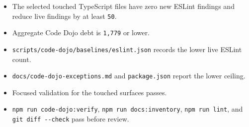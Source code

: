 \begin{itemize}
\tightlist
\item
  The selected touched TypeScript files have zero new ESLint findings and reduce live findings by at least \texttt{5\allowbreak{}0}.
\item
  Aggregate Code Dojo debt is \texttt{1\allowbreak{},\allowbreak{}7\allowbreak{}7\allowbreak{}9} or lower.
\item
  \texttt{s\allowbreak{}c\allowbreak{}r\allowbreak{}i\allowbreak{}p\allowbreak{}t\allowbreak{}s\allowbreak{}/\allowbreak{}c\allowbreak{}o\allowbreak{}d\allowbreak{}e\allowbreak{}-\allowbreak{}d\allowbreak{}o\allowbreak{}j\allowbreak{}o\allowbreak{}/\allowbreak{}b\allowbreak{}a\allowbreak{}s\allowbreak{}e\allowbreak{}l\allowbreak{}i\allowbreak{}n\allowbreak{}e\allowbreak{}s\allowbreak{}/\allowbreak{}e\allowbreak{}s\allowbreak{}l\allowbreak{}i\allowbreak{}n\allowbreak{}t\allowbreak{}.\allowbreak{}j\allowbreak{}s\allowbreak{}o\allowbreak{}n} records the lower live ESLint count.
\item
  \texttt{d\allowbreak{}o\allowbreak{}c\allowbreak{}s\allowbreak{}/\allowbreak{}c\allowbreak{}o\allowbreak{}d\allowbreak{}e\allowbreak{}-\allowbreak{}d\allowbreak{}o\allowbreak{}j\allowbreak{}o\allowbreak{}-\allowbreak{}e\allowbreak{}x\allowbreak{}c\allowbreak{}e\allowbreak{}p\allowbreak{}t\allowbreak{}i\allowbreak{}o\allowbreak{}n\allowbreak{}s\allowbreak{}.\allowbreak{}m\allowbreak{}d} and \texttt{p\allowbreak{}a\allowbreak{}c\allowbreak{}k\allowbreak{}a\allowbreak{}g\allowbreak{}e\allowbreak{}.\allowbreak{}j\allowbreak{}s\allowbreak{}o\allowbreak{}n} report the lower ceiling.
\item
  Focused validation for the touched surfaces passes.
\item
  \texttt{n\allowbreak{}p\allowbreak{}m\allowbreak{} \allowbreak{}r\allowbreak{}u\allowbreak{}n\allowbreak{} \allowbreak{}c\allowbreak{}o\allowbreak{}d\allowbreak{}e\allowbreak{}-\allowbreak{}d\allowbreak{}o\allowbreak{}j\allowbreak{}o\allowbreak{}:\allowbreak{}v\allowbreak{}e\allowbreak{}r\allowbreak{}i\allowbreak{}f\allowbreak{}y}, \texttt{n\allowbreak{}p\allowbreak{}m\allowbreak{} \allowbreak{}r\allowbreak{}u\allowbreak{}n\allowbreak{} \allowbreak{}d\allowbreak{}o\allowbreak{}c\allowbreak{}s\allowbreak{}:\allowbreak{}i\allowbreak{}n\allowbreak{}v\allowbreak{}e\allowbreak{}n\allowbreak{}t\allowbreak{}o\allowbreak{}r\allowbreak{}y}, \texttt{n\allowbreak{}p\allowbreak{}m\allowbreak{} \allowbreak{}r\allowbreak{}u\allowbreak{}n\allowbreak{} \allowbreak{}l\allowbreak{}i\allowbreak{}n\allowbreak{}t}, and \texttt{g\allowbreak{}i\allowbreak{}t\allowbreak{} \allowbreak{}d\allowbreak{}i\allowbreak{}f\allowbreak{}f\allowbreak{} \allowbreak{}-\allowbreak{}-\allowbreak{}c\allowbreak{}h\allowbreak{}e\allowbreak{}c\allowbreak{}k} pass before review.
\end{itemize}

